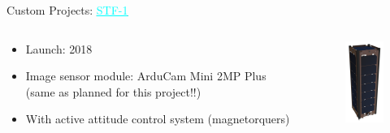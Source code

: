 
\begin{frame}{Custom Projects: \href{http://stf1.com/}{\textcolor{cyan}{\underline{STF-1}}}}

    \begin{columns}[t]
        \begin{column}[t]{0.6\textwidth}
            \begin{itemize}
                \item Launch: 2018
                \vspace{0.3cm}
                \item Image sensor module: ArduCam Mini 2MP Plus (same as planned for this project!!)
                \vspace{0.3cm}
                \item With active attitude control system (magnetorquers)
            \end{itemize}
        \end{column}
        \begin{column}[t]{0.4\textwidth}
            \begin{figure}[!ht]
                \begin{center}
                    \includegraphics[width=3cm]{figures/stf1_closed_top.png}
                \end{center}
            \end{figure}
        \end{column}
    \end{columns}

\end{frame}

